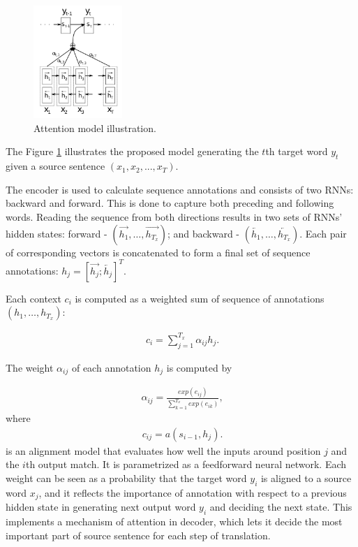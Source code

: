 \begin{figure}[H]
\centering
\includegraphics[width=0.3\textwidth]{figs/attention.png}
\caption[Attention model illustration]{Attention model illustration.}
\label{att-ill}
\end{figure}

The Figure \ref{att-ill} illustrates the proposed model generating the $t$th target word $y_t$ given a source sentence $(x_1,x_2,...,x_T )$.

The encoder is used to calculate sequence annotations and consists of two RNNs: backward and forward. This is done to capture both preceding and following words. Reading the sequence from both directions results in two sets of RNNs' hidden states: forward - $(\overrightarrow{h_1}, \dots, \overrightarrow{h_{T_x}})$; and backward - $(\overleftarrow{h_1}, \dots, \overleftarrow{h_{T_x}})$. Each pair of corresponding vectors is concatenated to form a final set of sequence annotations: $h_j = [\overrightarrow{h_j}; \overleftarrow{h_j}]^T$.

Each context $c_i$ is computed as a weighted sum of sequence of annotations $(h_1, \dots, h_{T_{x}})$:

\begin{align}
\label{cont-vec}
\ c_i = \sum_{j=1}^{T_x} \alpha_{ij}h_j.
\end{align}

The weight $\alpha_{ij}$ of each annotation $h_j$ is computed by

\begin{align}
\label{ann-weight}
\ \alpha_{ij} = \frac{exp(e_{ij})}{\sum_{k=1}^{T_x}exp(e_{ik})},
\end{align}
where
\begin{align}
\ c_{ij} = a(s_{i-1}, h_j).
\end{align}
is an alignment model that evaluates how well the inputs around position $j$ and the $i$th output match. It is parametrized as a feedforward neural network. Each weight can be seen as a probability that the target word $y_i$ is aligned to a source word $x_j$, and it reflects the importance of annotation with respect to a previous hidden state in generating next output word $y_i$ and deciding the next state. This implements a mechanism of attention in decoder, which lets it decide the most important part of source sentence for each step of translation. 

